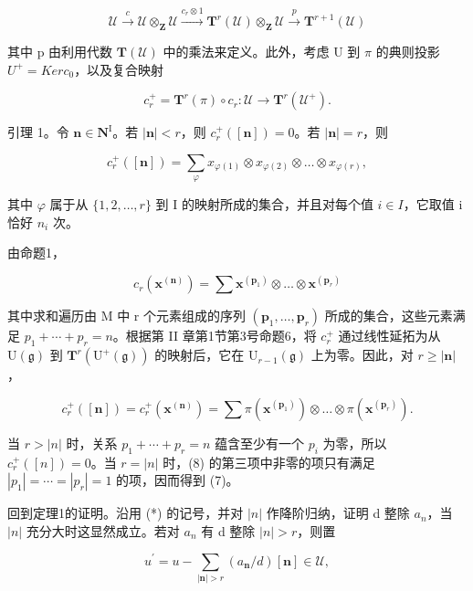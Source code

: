 \[
\mathcal {U} \stackrel {{c}} {{\longrightarrow}} \mathcal {U} \otimes_ {\mathbf {Z}} \mathcal {U} \stackrel {{c _ {r} \otimes 1}} {{\longrightarrow}} \mathbf {T} ^ {r} (\mathcal {U}) \otimes_ {\mathbf {Z}} \mathcal {U} \stackrel {{p}} {{\longrightarrow}} \mathbf {T} ^ {r + 1} (\mathcal {U})
\]

其中 p 由利用代数 \(\mathbf{T}(\mathcal{U})\) 中的乘法来定义。此外，考虑 U 到 \(\pi\) 的典则投影 \(U^{+} = Ker c_{0}\)，以及复合映射

\[
c _ {r} ^ {+} = \mathbf {T} ^ {r} (\pi) \circ c _ {r}: \mathcal {U} \to \mathbf {T} ^ {r} (\mathcal {U} ^ {+}).
\]

引理 1。令 \(\mathbf{n} \in \mathbf{N}^{\mathrm{I}}\)。若 \(|\mathbf{n}| < r\)，则 \(c_{r}^{+}([ \mathbf{n}]) = 0\)。若 \(|\mathbf{n}| = r\)，则

\[
c _ {r} ^ {+} ([ \mathbf {n} ]) = \sum_ {\varphi} x _ {\varphi (1)} \otimes x _ {\varphi (2)} \otimes \dots \otimes x _ {\varphi (r)},\tag{7}
\]

其中 \(\varphi\) 属于从 \(\{1,2,\ldots,r\}\) 到 I 的映射所成的集合，并且对每个值 \(i\in I\)，它取值 i 恰好 \(n_{i}\) 次。

由命题1，

\[
c _ {r} \left(\mathbf {x} ^ {(\mathbf {n})}\right) = \sum \mathbf {x} ^ {\left(\mathbf {p} _ {1}\right)} \otimes \dots \otimes \mathbf {x} ^ {\left(\mathbf {p} _ {r}\right)}
\]

其中求和遍历由 M 中 r 个元素组成的序列 \((\mathbf{p}_{1},\ldots,\mathbf{p}_{r})\) 所成的集合，这些元素满足 \(p_{1}+\cdots+p_{r}=n\)。根据第 II 章第1节第3号命题6，将 \(c_{r}^{+}\) 通过线性延拓为从 \(\mathrm{U}(\mathfrak{g})\) 到 \(\mathbf{T}^{r}(\mathrm{U}^{+}(\mathfrak{g}))\) 的映射后，它在 \(\mathrm{U}_{r-1}(\mathfrak{g})\) 上为零。因此，对 \(r\geq|\mathbf{n}|\)，

\[
c _ {r} ^ {+} ([ \mathbf {n} ]) = c _ {r} ^ {+} (\mathbf {x} ^ {(\mathbf {n})}) = \sum \pi (\mathbf {x} ^ {(\mathbf {p} _ {1})}) \otimes \dots \otimes \pi (\mathbf {x} ^ {(\mathbf {p} _ {r})}).\tag{8}
\]

当 \(r > |n|\) 时，关系 \(p_{1} + \cdots + p_{r} = n\) 蕴含至少有一个 \(p_{i}\) 为零，所以 \(c_{r}^{+}([n]) = 0\)。当 \(r = |n|\) 时，(8) 的第三项中非零的项只有满足 \(|p_{1}| = \cdots = |p_{r}| = 1\) 的项，因而得到 (7)。

回到定理1的证明。沿用 (*) 的记号，并对 \(|n|\) 作降阶归纳，证明 d 整除 \(a_{n}\)，当 \(|n|\) 充分大时这显然成立。若对 \(a_{n}\) 有 d 整除 \(|n| > r\)，则置

\[
u ^ {\prime} = u - \sum_ {| \mathbf {n} | > r} (a _ {\mathbf {n}} / d) [ \mathbf {n} ] \in \mathcal {U},
\]

